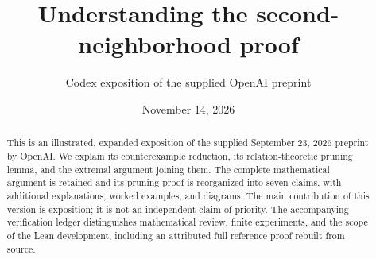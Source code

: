 \documentclass[11pt]{article}
\title{Understanding the second-neighborhood proof}
\author{Codex exposition of the supplied OpenAI preprint}
\date{November 14, 2026}
\theoremstyle{remark}
\begin{document}
\maketitle
\begin{abstract}
This is an illustrated, expanded exposition of the supplied September 23,
2026 preprint by OpenAI. We explain its counterexample reduction, its
relation-theoretic pruning lemma, and the extremal argument joining them.
The complete mathematical argument is retained and its pruning proof is
reorganized into seven claims, with additional explanations,
worked examples, and diagrams. The main contribution of this version is
exposition; it is not an independent claim of priority. The accompanying
verification ledger distinguishes mathematical review, finite experiments,
and the scope of the Lean development, including an attributed full
reference proof rebuilt from source.
\end{abstract}
\tableofcontents











\end{document}
